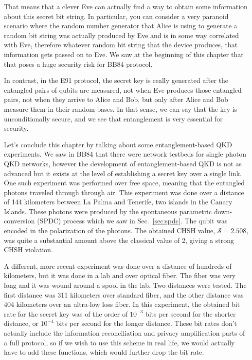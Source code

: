 That means that a clever Eve can actually find a way to obtain some information about this secret bit string. In particular, you can consider a very paranoid scenario where the random number generator that Alice is using to generate a random bit string was actually produced by Eve and is in some way correlated with Eve, therefore whatever random bit string that the device produces, that information gets passed on to Eve. We saw at the beginning of this chapter that that poses a huge security risk for BB84 protocol.

In contrast, in the E91 protocol, the secret key is really generated after the entangled pairs of qubits are measured, not when Eve produces those entangled pairs, not when they arrive to Alice and Bob, but only after Alice and Bob measure them in their random bases. In that sense, we can say that the key is unconditionally secure, and we see that entanglement is very essential for security.

Let's conclude this chapter by talking about some entanglement-based QKD experiments. We saw in BB84 that there were network testbeds for single photon QKD networks, however the development of entanglement-based QKD is not as advanced but it exists at the level of establishing a secret key over a single link. One such experiment was performed over free space, meaning that the entangled photons traveled through through air.  This experiment was done over a distance of 144 kilometers between La Palma and Tenerife, two islands in the Canary Islands. These photons were produced by the spontaneous parametric down-conversion (SPDC) process which we saw in Sec.~\ref{sec:spdc}. The qubit was encoded in the polarization of the photons. The obtained CHSH value, $\mathcal{S} =2.508$, was quite a substantial amount above the classical value of 2, giving a strong CHSH violation.

A different, more recent experiment was done over a distance of hundreds of kilometers, but it was done in a lab and over optical fiber. The fiber was very long and it was wound around a spool in the lab.  Two distances were tested. The  first distance was 311 kilometers over standard fiber, and the other distance was 404 kilometers over an ultra-low loss fiber.  In this experiment, the obtained bit rate for the secret key was of the order of $10^{-3}$ bits per second for the shorter distance, or $10^{-4}$ bits per second for the longer distance. These bit rates don't actually include the information reconciliation and privacy amplification parts of a full protocol, so if we wish to use this scheme in real life, we would actually have to add these functions, which would further drop the bit rate.

